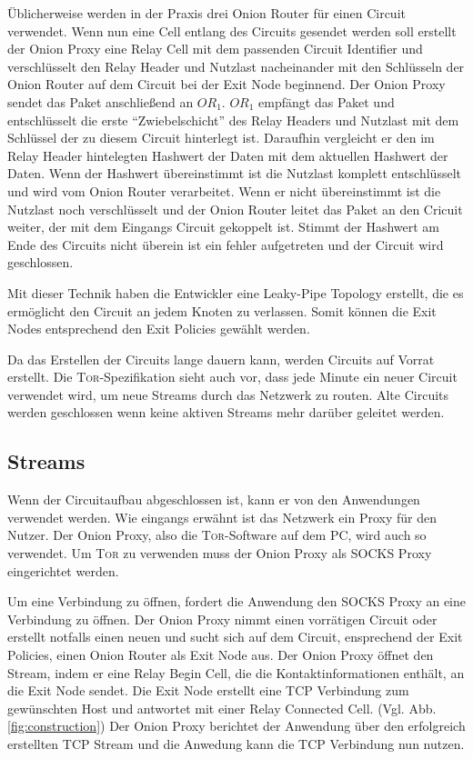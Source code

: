 \documentclass[fleqn,envcountsame,runningheads,10pt,a4paper]{llncs}
\begin{document}
Üblicherweise werden in der Praxis drei Onion Router für einen Circuit verwendet. Wenn nun eine Cell entlang des Circuits gesendet werden soll erstellt der Onion Proxy eine Relay Cell mit dem passenden Circuit Identifier und verschlüsselt den Relay Header und Nutzlast nacheinander mit den Schlüsseln der Onion Router auf dem Circuit bei der Exit Node beginnend. Der Onion Proxy sendet das Paket anschließend an $\textit{OR}_1$. $\textit{OR}_1$ empfängt das Paket und entschlüsselt die erste ``Zwiebelschicht'' des Relay Headers und Nutzlast mit dem Schlüssel der zu diesem Circuit hinterlegt ist. Daraufhin vergleicht er den im Relay Header hintelegten Hashwert der Daten mit dem aktuellen Hashwert der Daten. Wenn der Hashwert übereinstimmt ist die Nutzlast komplett entschlüsselt und wird vom Onion Router verarbeitet. Wenn er nicht übereinstimmt ist die Nutzlast noch verschlüsselt und der Onion Router leitet das Paket an den Cricuit weiter, der mit dem Eingangs Circuit gekoppelt ist. Stimmt der Hashwert am Ende des Circuits nicht überein ist ein fehler aufgetreten und der Circuit wird geschlossen.

Mit dieser Technik haben die Entwickler eine Leaky-Pipe Topology erstellt, die es ermöglicht den Circuit an jedem Knoten zu verlassen. Somit können die Exit Nodes entsprechend den Exit Policies gewählt werden.

Da das Erstellen der Circuits lange dauern kann, werden Circuits auf Vorrat erstellt. Die \textsc{Tor}-Spezifikation sieht auch vor, dass jede Minute ein neuer Circuit verwendet wird, um neue Streams durch das Netzwerk zu routen. Alte Circuits werden geschlossen wenn keine aktiven Streams mehr darüber geleitet werden.
   
\subsection{Streams}

Wenn der Circuitaufbau abgeschlossen ist, kann er von den Anwendungen verwendet werden. Wie eingangs erwähnt ist das Netzwerk ein Proxy für den Nutzer. Der Onion Proxy, also die \textsc{Tor}-Software auf dem PC, wird auch so verwendet. Um \textsc{Tor} zu verwenden muss der Onion Proxy als SOCKS Proxy \cite{rfc:socks} eingerichtet werden.

Um eine Verbindung zu öffnen, fordert die Anwendung den SOCKS Proxy an eine Verbindung zu öffnen. Der Onion Proxy nimmt einen vorrätigen Circuit oder erstellt notfalls einen neuen und sucht sich auf dem Circuit, ensprechend der Exit Policies, einen Onion Router als Exit Node aus. Der Onion Proxy öffnet den Stream, indem er eine Relay Begin Cell, die die Kontaktinformationen enthält, an die Exit Node sendet. Die Exit Node erstellt eine TCP Verbindung zum gewünschten Host und antwortet mit einer Relay Connected Cell. (Vgl. Abb. \ref{fig:construction}) Der Onion Proxy berichtet der Anwendung über den erfolgreich erstellten TCP Stream und die Anwedung kann die TCP Verbindung nun nutzen.
\end{document}
